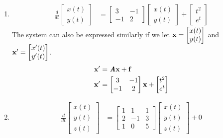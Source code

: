 \documentclass{article}
\begin{document}
\begin{enumerate}[label = \textbf{\arabic*)}]
	\item
		\begin{align*}
			\frac{d}{dt} \begin{bmatrix} x(t) \\ y(t) \end{bmatrix} & = \begin{bmatrix} 3 & -1 \\ -1 & 2 \end{bmatrix} \begin{bmatrix} x(t) \\ y(t) \end{bmatrix} + \begin{bmatrix} t^2 \\ e^t \end{bmatrix}
		\end{align*}
		The system can also be expressed similarly if we let $ \textbf{x} = \begin{bmatrix} x(t) \\ y(t) \end{bmatrix} $ and $ \textbf{x}' = \begin{bmatrix} x'(t) \\ y'(t) \end{bmatrix} $.
		\begin{align*}
			\textbf{x}' & = \textbf{\textit{A}}\textbf{x} + \textbf{f} \\
			\textbf{x}' & = \begin{bmatrix} 3 & -1 \\ -1 & 2 \end{bmatrix} \textbf{x} + \begin{bmatrix} t^2 \\ e^t \end{bmatrix}
		\end{align*}
	\item
		\begin{align*}
			\frac{d}{dt} \begin{bmatrix} x(t) \\ y(t) \\ z(t) \end{bmatrix} & =
				\begin{bmatrix}
					1 & 1 & 1 \\
					2 & -1 & 3 \\
					1 & 0 & 5
				\end{bmatrix}
				\begin{bmatrix} x(t) \\ y(t) \\ z(t) \end{bmatrix} + 0

\end{align*}
\end{enumerate}
\end{document}
